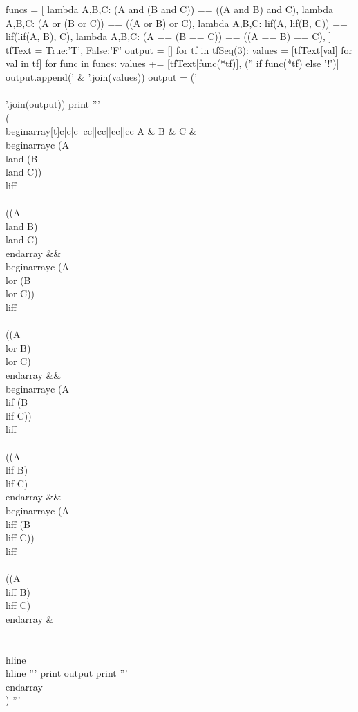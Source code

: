 \setcounter{enumi}{12}

\item
\begin{python}[truth.py]
funcs = [
    lambda A,B,C: (A and (B and C)) == ((A and B) and C),
    lambda A,B,C: (A or (B or C)) == ((A or B) or C),
    lambda A,B,C: lif(A, lif(B, C)) == lif(lif(A, B), C),
    lambda A,B,C: (A == (B == C)) == ((A == B) == C),
]
tfText = {True:'T', False:'F'}
output = []
for tf in tfSeq(3):
    values = [tfText[val] for val in tf]
    for func in funcs:
        values += [tfText[func(*tf)], ('' if func(*tf) else '!')]
    output.append(' & '.join(values))
output = (' \\\\\n'.join(output))
print '''
\\(
\\begin{array}[t]{c|c|c||cc||cc||cc||cc}
A & B & C &
\\begin{array}{c} (A \\land (B \\land C)) \\liff \\\\ ((A \\land B) \\land C) \\end{array} &&
\\begin{array}{c} (A \\lor (B \\lor C)) \\liff \\\\ ((A \\lor B) \\lor C) \\end{array} &&
\\begin{array}{c} (A \\lif (B \\lif C)) \\liff \\\\ ((A \\lif B) \\lif C) \\end{array} &&
\\begin{array}{c} (A \\liff (B \\liff C)) \\liff \\\\ ((A \\liff B) \\liff C) \\end{array}  & \\\\
\\hline
\\hline
'''
print output
print '''
\\end{array}
\\)
'''
\end{python}

